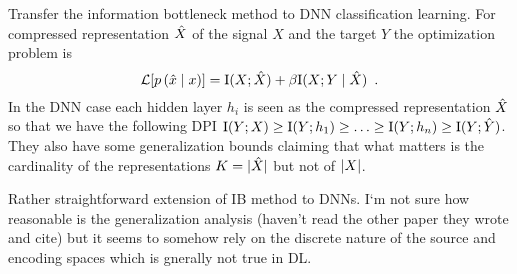 \begin{notebox}
\tldr Transfer the information bottleneck method to DNN classification learning.
For compressed representation $\hat{X}$ of the signal $X$ and the target $Y$ the optimization problem is
\begin{equation}
\mathcal{L}[ p \left( \hat{x} \mid x \right)] = \mathrm{I}(X; \hat{X}) + \beta \mathrm{I}(X; Y \mid \hat{X}) \enspace .
\end{equation}
In the DNN case each hidden layer $h_i$ is seen as the compressed representation $\hat{X}$ so that we have the following DPI  $\mathrm{I}(Y; X) \geq \mathrm{I}(Y; h_1) \geq \ldots \geq \mathrm{I}(Y; h_n) \geq \mathrm{I}(Y; \hat{Y})$.
They also have some generalization bounds claiming that what matters is the cardinality of the representations $K = \lvert \hat{X} \rvert$ but not of $\lvert X \rvert$. 
\end{notebox}

\begin{notebox}
\concl Rather straightforward extension of IB method to DNNs. I`m not sure how reasonable is the generalization analysis (haven't read the other paper they wrote and cite) but it seems to somehow rely on the discrete nature of the source and encoding spaces which is gnerally not true in DL.
\end{notebox}
